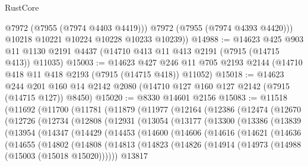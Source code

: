 \begin{lexlean}{RustCore}
\begin{coremodule}
            @7972
            (@7955 (@7974 @4403 @4419)))
          @7972
          (@7955 (@7974 @4393 @4420)))
        @10218
        @10221
        @10224
        @10228
        @10233
        @10239))
@14988 := @14623
    @425
    @903
    @11
    @1130
    @2191
    @4437
    (@14710 @413 @11 @413 @2191 (@7915 (@14715 @413)) @11035)
@15003 := @14623
    @427
    @246
    @11
    @705
    @2193
    @2144
    (@14710 @418 @11 @418 @2193 (@7915 (@14715 @418)) @11052)
@15018 := @14623
    @244
    @201
    @160
    @14
    @2142
    @2080
    (@14710 @127 @160 @127 @2142 (@7915 (@14715 @127)) @8450)
@15020 := @8330 @14601 @2156
@15083 := @11518
    (@11692
      (@11700
        (@11781
          (@11879
            (@11977
              (@12164
                (@12386
                  (@12474
                    (@12670
                      (@12726
                        (@12734
                          (@12808
                            (@12931
                              (@13054
                                (@13177
                                  (@13300
                                    (@13386
                                      (@13839
                                        (@13954
                                          (@14347
                                            (@14429
                                              (@14453
                                                (@14600
                                                  (@14606
                                                    (@14616
                                                      (@14621
                                                        (@14636
                                                          (@14655
                                                            (@14802
                                                              (@14808
                                                                (@14813
                                                                  (@14823
                                                                    (@14826
                                                                      (@14914
                                                                        (@14973
                                                                          (@14988
                                                                            (@15003
                                                                              (@15018 @15020))))))
                                                                    @13817

\end{coremodule}
\end{lexlean}
